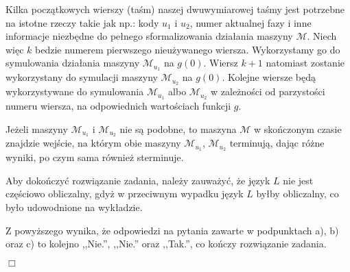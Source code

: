 \documentclass[12pt]{article}
\begin{document}
	\medskip
	
	Kilka początkowych wierszy (taśm) naszej dwuwymiarowej taśmy jest potrzebne
	na istotne rzeczy takie jak np.: kody \(u_{1}\) i \(u_{2}\), numer aktualnej
	fazy i inne informacje niezbędne do pełnego sformalizowania działania
	maszyny \(\mathcal{M}\). Niech więc \(k\) bedzie numerem pierwszego
	nieużywanego wiersza. Wykorzystamy go do symulowania działania maszyny
	\(\mathcal{M}_{u_{1}}\) na \(g \left( 0 \right)\). Wiersz \(k + 1\)
	natomiast zostanie wykorzystany do symulacji maszyny \(\mathcal{M}_{u_{2}}\)
	na \(g \left( 0 \right)\). Kolejne wiersze będą wykorzystywane do
	symulowania \(\mathcal{M}_{u_{1}}\) albo \(\mathcal{M}_{u_{2}}\) w
	zależności od parzystości numeru wiersza, na odpowiednich wartościach
	funkcji \(g\).
	
	\medskip
	
	Jeżeli maszyny \(\mathcal{M}_{u_{1}}\) i \(\mathcal{M}_{u_{2}}\) nie są
	podobne, to maszyna \(\mathcal{M}\) w skończonym czasie znajdzie wejście,
	na którym obie maszyny \(\mathcal{M}_{u_{1}}\), \(\mathcal{M}_{u_{2}}\)
	terminują, dając różne wyniki, po czym sama również sterminuje.
	
	\bigskip
	
	Aby dokończyć rozwiązanie zadania, należy zauważyć, że język \(L\) nie jest
	częściowo obliczalny, gdyż w przeciwnym wypadku język \(L\) byłby
	obliczalny, co było udowodnione na wykładzie.
	
	\bigskip
	
	Z powyższego wynika, że odpowiedzi na pytania zawarte w podpunktach a), b)
	oraz c) to kolejno ,,Nie.'', ,,Nie.'' oraz ,,Tak.'', co kończy rozwiązanie
	zadania.
	\begin{flushright}
		\(\Box\)
	\end{flushright}
\end{document}
